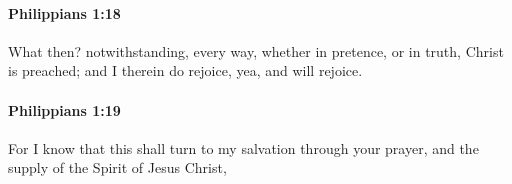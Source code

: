 		\paragraph{Philippians 1:18} %
			\label{PHILIPPIANS-1-18}

			What then?  notwithstanding, every way, whether in pretence, or in truth, Christ is preached; and I therein do rejoice, yea, and will rejoice.

			\begin{framed}
			\scriptsize
				\begin{compactdesc}
					\item[SBLG] 
				\end{compactdesc}
			\end{framed}

		\paragraph{Philippians 1:19} %
			\label{PHILIPPIANS-1-19}

			For I know that this shall turn to my salvation through your prayer, and the supply of the Spirit of Jesus Christ,

